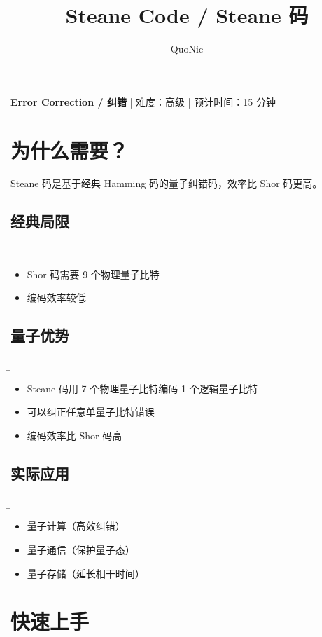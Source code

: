 \documentclass[12pt,a4paper]{article}
\title{Steane Code / Steane 码}
\author{QuoNic}
\date{}
\begin{document}
\maketitle

\begin{center}
\textbf{Error Correction / 纠错} | 难度：高级 | 预计时间：15 分钟
\end{center}

\tableofcontents
\newpage

\section{为什么需要？}

Steane 码是基于经典 Hamming 码的量子纠错码，效率比 Shor 码更高。

\subsection{经典局限}
\b\begin{itemize}
  \item Shor 码需要 9 个物理量子比特
  \item 编码效率较低
\end{itemize}

\subsection{量子优势}
\b\begin{itemize}
  \item Steane 码用 7 个物理量子比特编码 1 个逻辑量子比特
  \item 可以纠正任意单量子比特错误
  \item 编码效率比 Shor 码高
\end{itemize}

\subsection{实际应用}
\b\begin{itemize}
  \item 量子计算（高效纠错）
  \item 量子通信（保护量子态）
  \item 量子存储（延长相干时间）
\end{itemize}

\section{快速上手}
\end{document}
